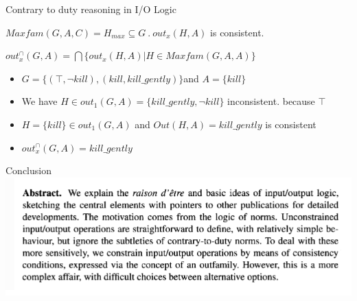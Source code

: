 \documentclass[9pt]{beamer}
\begin{document}
\begin{frame}{Contrary to duty reasoning in I/O Logic}
\begin{definition}
	$Maxfam(G,A,C)= H_{max} \subseteq G~.~out_x(H,A)$ is consistent. 
\end{definition}
\begin{definition}
	$out_x^{\cap}(G,A)= \bigcap\{out_x (H,A) | H \in Maxfam(G,A,A)\} $
\end{definition}
\begin{example}
	\begin{itemize}
	\item $G=\{(\top, \lnot kill), (kill, kill\_gently)\} $and $A=\{kill\}$
	\item We have $H\in out_1(G,A)=\{kill\_gently, \lnot kill\}$ inconsistent. because $\top$
    \item $H=\{kill\} \in out_1(G,A)$ and $Out(H,A) = kill\_gently$ is consistent
	\item $out_x^{\cap}(G,A)=kill\_gently$
	\end{itemize}
\end{example}
\end{frame}
\begin{frame}{Conclusion}
\centering
\includegraphics[scale=0.50]{conclusion.png}
\end{frame}
\end{document}
